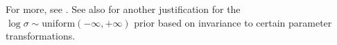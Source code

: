 \documentclass{scrartcl}
\begin{document}
For more, see \citet[pages 41-47]{zellner}. See also \citet[Section 12.4]{jaynes}
for another justification for the $\log \sigma \sim
\text{uniform}(-\infty, +\infty)$ prior based on invariance to certain
parameter transformations. 



  
  



\end{document}
